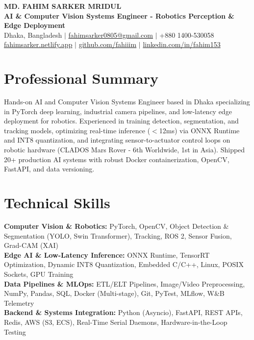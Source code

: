 \documentclass[9.5pt,a4paper]{article}
\begin{document}
{\centering
    {\Large \textbf{MD. FAHIM SARKER MRIDUL}}\\[1pt]
    \textbf{AI \& Computer Vision Systems Engineer - Robotics Perception \& Edge Deployment}\\[1pt]
    Dhaka, Bangladesh \;$\vert$\; \href{mailto:fahimsarker0805@gmail.com}{fahimsarker0805@gmail.com} \;$\vert$\; +880 1400-530058\\[1pt]
    \href{https://fahimsarker.netlify.app}{fahimsarker.netlify.app} \;$\vert$\; \href{https://github.com/fahiiim}{github.com/fahiiim} \;$\vert$\; \href{https://linkedin.com/in/fahim153}{linkedin.com/in/fahim153}\par
}

\vspace{-4.5pt}
\section*{Professional Summary}
Hands-on AI and Computer Vision Systems Engineer based in Dhaka specializing in PyTorch deep learning, industrial camera pipelines, and low-latency edge deployment for robotics. Experienced in training detection, segmentation, and tracking models, optimizing real-time inference ($<$12ms) via ONNX Runtime and INT8 quantization, and integrating sensor-to-actuator control loops on robotic hardware (CLADOS Mars Rover - 6th Worldwide, 1st in Asia). Shipped 20+ production AI systems with robust Docker containerization, OpenCV, FastAPI, and data versioning.

\section*{Technical Skills}
\noindent
\textbf{Computer Vision \& Robotics:} PyTorch, OpenCV, Object Detection \& Segmentation (YOLO, Swin Transformer), Tracking, ROS 2, Sensor Fusion, Grad-CAM (XAI)\\
\textbf{Edge AI \& Low-Latency Inference:} ONNX Runtime, TensorRT Optimization, Dynamic INT8 Quantization, Embedded C/C++, Linux, POSIX Sockets, GPU Training\\
\textbf{Data Pipelines \& MLOps:} ETL/ELT Pipelines, Image/Video Preprocessing, NumPy, Pandas, SQL, Docker (Multi-stage), Git, PyTest, MLflow, W\&B Telemetry\\
\textbf{Backend \& Systems Integration:} Python (Asyncio), FastAPI, REST APIs, Redis, AWS (S3, ECS), Real-Time Serial Daemons, Hardware-in-the-Loop Testing
\end{document}
